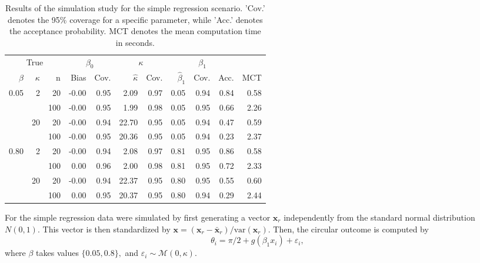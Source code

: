 \documentclass[11pt,a4paper]{article}\usepackage[]{graphicx}\usepackage[]{color}
\newcommand{\bx}{\boldsymbol{x}}
\begin{document}
\begin{table}[btp]
\centering
\begin{small}
\caption{Results of the simulation study for the simple regression scenario. 'Cov.' denotes the 95\% coverage for a specific parameter, while 'Acc.' denotes the acceptance probability. MCT denotes the mean computation time in seconds.} 
\label{tableOneLinearPredictor}
\begin{tabular}{rrrrrrrrrrr}
  \toprule \multicolumn{3}{c}{True} & \multicolumn{2}{c}{$\beta_0$} & \multicolumn{2}{c}{$\kappa$} & \multicolumn{3}{c}{$\beta_1$} & \\  \cmidrule(lr){1-3} \cmidrule(lr){4-5} \cmidrule(lr){6-7} \cmidrule(lr){8-10}$\beta$ & $\kappa$ & n & Bias  & Cov.  & $\hat{\kappa}$ & Cov.  & $\hat{\beta}_1$ & Cov.  & Acc. & MCT \\ 
  \midrule
0.05 & 2 & 20 & -0.00 & 0.95 & 2.09 & 0.97 & 0.05 & 0.94 & 0.84 & 0.58 \\ 
   \vspace{0.2cm}  &  & 100 & -0.00 & 0.95 & 1.99 & 0.98 & 0.05 & 0.95 & 0.66 & 2.26 \\ 
   & 20 & 20 & -0.00 & 0.94 & 22.70 & 0.95 & 0.05 & 0.94 & 0.47 & 0.59 \\ 
   \vspace{0.2cm}  &  & 100 & -0.00 & 0.95 & 20.36 & 0.95 & 0.05 & 0.94 & 0.23 & 2.37 \\ 
  0.80 & 2 & 20 & -0.00 & 0.94 & 2.08 & 0.97 & 0.81 & 0.95 & 0.86 & 0.58 \\ 
   \vspace{0.2cm}  &  & 100 & 0.00 & 0.96 & 2.00 & 0.98 & 0.81 & 0.95 & 0.72 & 2.33 \\ 
   & 20 & 20 & -0.00 & 0.94 & 22.37 & 0.95 & 0.80 & 0.95 & 0.55 & 0.60 \\ 
   &  & 100 & 0.00 & 0.95 & 20.37 & 0.95 & 0.80 & 0.94 & 0.29 & 2.44 \\ 
   \bottomrule
\end{tabular}
\end{small}
\end{table}


For the simple regression data were simulated by first generating a vector \( \bx_r \) independently from the standard normal distribution \( N(0, 1).\) This vector is then standardized by \( \bx = (\bx_r - \bar{\bx}_r) / \text{var} (\bx_r).\) Then, the circular outcome is computed by
\begin{equation}
\theta_i = \pi/2 + g \left(\beta_1 x_i\right) + \varepsilon_i,
\end{equation}
where \( \beta \) takes values \( \{ 0.05, 0.8 \},\) and \( \varepsilon_i \sim \mathcal{M}(0, \kappa).\)
\end{document}
